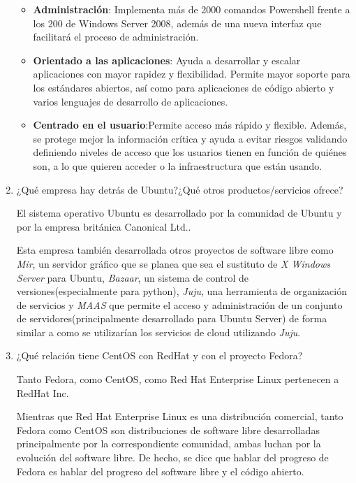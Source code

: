 \documentclass[paper=a4, fontsize=11pt]{scrartcl} %
\numberwithin{equation}{section} %
\numberwithin{figure}{section} %
\numberwithin{table}{section} %
\begin{document}
\begin{enumerate}
\begin{itemize}
			\item \textbf{Administración}\cite{TechWeek}: Implementa más de 2000 comandos
			Powershell frente a los 200 de Windows Server 2008, además de una nueva interfaz
			que facilitará el proceso de administración.
			
			\item \textbf{Orientado a las aplicaciones}\cite{Hoja_Datos}\cite{Overview}: Ayuda a
			desarrollar y escalar aplicaciones con mayor rapidez y flexibilidad. Permite mayor
			soporte para los estándares abiertos, así como para aplicaciones de código abierto y
			varios lenguajes de desarrollo de aplicaciones.
			
			\item \textbf{Centrado en el usuario}\cite{Hoja_Datos}\cite{Overview}:Permite acceso
			más rápido y flexible. Además, se protege mejor la información crítica y ayuda a
			evitar riesgos validando definiendo niveles de acceso que los usuarios tienen en
			función de quiénes son, a lo que quieren acceder o la infraestructura que están usando.
		\end{itemize}
		
		\item ¿Qué empresa hay detrás de Ubuntu?¿Qué otros productos/servicios ofrece?
		
		El sistema operativo Ubuntu\cite{Ubuntu} es desarrollado por la comunidad de Ubuntu y por la
		empresa británica Canonical Ltd.\cite{Canonical}.
		
		Esta empresa también desarrollada otros proyectos de software libre como \textit{Mir}, un
		servidor gráfico que se planea que sea el sustituto de \textit{X Windows Server} para Ubuntu,
		\textit{Bazaar}, un sistema de control de versiones(especialmente para python), \textit{Juju},
		una herramienta de organización de servicios y \textit{MAAS}\cite{MAAS} que permite el acceso
		y administración de un conjunto de servidores(principalmente desarrollado para Ubuntu Server)
		de forma similar a como se utilizarían los servicios de cloud utilizando \textit{Juju}.
		
		\item ¿Qué relación tiene CentOS con RedHat y con el proyecto Fedora?
		
		Tanto Fedora\cite{Fedora}, como CentOS\cite{CentOS}, como Red Hat Enterprise Linux\cite{RedHat}
		pertenecen a RedHat Inc.
		
		Mientras que Red Hat Enterprise Linux es una distribución comercial, tanto Fedora como CentOS
		son distribuciones de software libre desarrolladas principalmente por la correspondiente
		comunidad, ambas luchan por la evolución del software libre. De hecho, se dice que hablar del
		progreso de Fedora es hablar del progreso del software libre y el código abierto\cite{cita}.
		

\end{enumerate}
\end{document}
